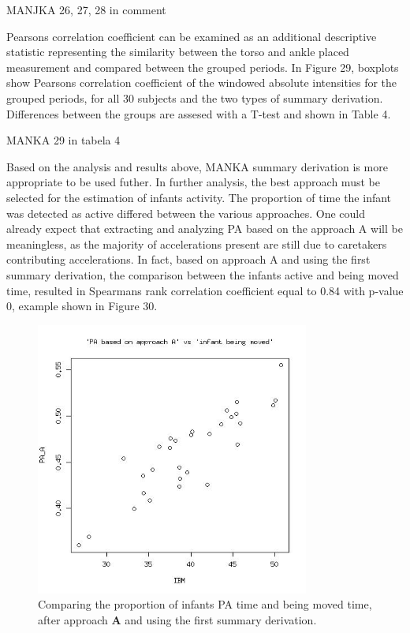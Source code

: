 \documentclass{article}
\begin{document}
{MANJKA 26, 27, 28 in comment

Pearsons correlation coefficient can be examined as an additional descriptive statistic representing the similarity between the torso and ankle placed measurement and compared between the grouped periods. In Figure 29, boxplots show Pearsons correlation coefficient of the windowed absolute intensities for the grouped periods, for all 30 subjects and the two types of summary derivation. Differences between the groups are assesed with a T-test and shown in Table 4.

MANKA 29 in tabela 4


Based on the analysis and results above, MANKA summary derivation is more appropriate to be used futher. In further analysis, the best approach must be selected for the estimation of infants activity.
The proportion of time the infant was detected as active differed between the various approaches. One could already expect that extracting and analyzing PA based on the approach A will be meaningless, as the majority of accelerations present are still due to caretakers contributing accelerations. In fact, based on approach A and using the first summary derivation, the comparison between the infants active and being moved time, resulted in Spearmans rank correlation coefficient equal to 0.84 with p-value 0, example shown in Figure 30.
\begin{figure}[h]
\includegraphics[width=9cm, height=9cm]{PAAIBM.jpg}
\caption{Comparing the proportion of infants PA time and being moved time, after approach \textbf{A} and using the first summary derivation.}
\end{figure}
\\
}
\end{document}

